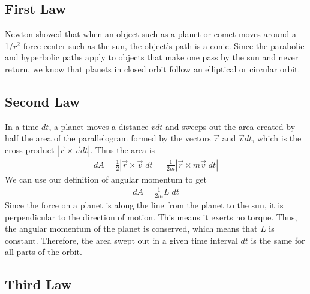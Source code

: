 \documentclass[11pt]{article}
\begin{document}
\subsection{First Law}

Newton showed that when an object such as a planet or comet moves around a 1/$r^2$ force center such as the sun, the object's path is a conic. Since the parabolic and hyperbolic paths apply to objects that make one pass by the sun and never return, we know that planets in closed orbit follow an elliptical or circular orbit. 

\subsection{Second Law}

In a time $dt$, a planet moves a distance $vdt$ and sweeps out the area created by half the area of the parallelogram formed by the vectors $\Vec{r}$ and $\Vec{v}dt$, which is the cross product $|\Vec{r}\times\Vec{v} dt|$. Thus the area is
\begin{align*}
    dA = \frac{1}{2}|\Vec{r}\times\Vec{v}\;dt| = \frac{1}{2m} |\Vec{r}\times m\Vec{v}\;dt|
\end{align*}
We can use our definition of angular momentum to get
\begin{align*}
    dA = \frac{1}{2m}L\;dt
\end{align*}
Since the force on a planet is along the line from the planet to the sun, it is perpendicular to the direction of motion. This means it exerts no torque. Thus, the angular momentum of the planet is conserved, which means that $L$ is constant. Therefore, the area swept out in a given time interval $dt$ is the same for all parts of the orbit.

\subsection{Third Law}
\end{document}
